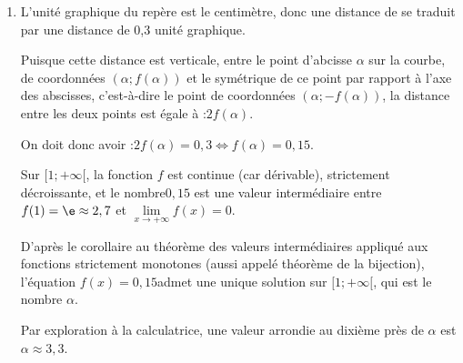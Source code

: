 \begin{enumerate}
\begin{enumerate}
			\item La fonction exponentielle est à valeurs strictement positives, donc $f'(x)$ est du même signe que l'expression affine $(-4x + 4)$, décroissante sur $\R$ et s'annulant pour $x = 1$.

			On en déduit que $f$ changera de variation en $x = 1$.

			Calculons : \quad $f(0) = (2\times 0 -1)\e^{-2\times 0 +3} = -\e^{3}$,\quad $f(1) = (2\times 1 - 1)\e^{-2\times 1+3} = \e$.

			On peut donc construire le tableau de variations complet de la fonction $f$ :

			\begin{center}
			\end{center}
		\end{enumerate}

		\item L'unité graphique du repère est le centimètre, donc une distance de  se traduit par une distance de 0,3 unité graphique.

		Puisque cette distance est verticale, entre le point d'abcisse $\alpha$ sur la courbe, de coordonnées $(\alpha ; f(\alpha))$ et le symétrique de ce point par rapport à l'axe des abscisses, c'est-à-dire le point de coordonnées $(\alpha ; -f(\alpha))$, la distance entre les deux points est égale à :\quad $2f(\alpha)$.

		On doit donc avoir :\quad $2f(\alpha) = 0,3 \iff f(\alpha) = 0,15$.

		Sur $[1 ; + \infty[$, la fonction $f$ est continue (car dérivable), strictement décroissante, et le nombre$ 0,15$ est une valeur intermédiaire entre $f(1) = \e \approx 2,7$ et $\lim\limits_{x \to +\infty} f(x)=0$.

		D'après le corollaire au théorème des valeurs intermédiaires appliqué aux fonctions strictement monotones (aussi appelé théorème de la bijection), l'équation \quad $f(x) = 0,15$\quad admet une unique solution sur $[1 ; +\infty[$, qui est le nombre $\alpha$.

		Par exploration à la calculatrice, une valeur arrondie au dixième près de $\alpha$ est $\alpha \approx 3,3$.
	\end{enumerate}

